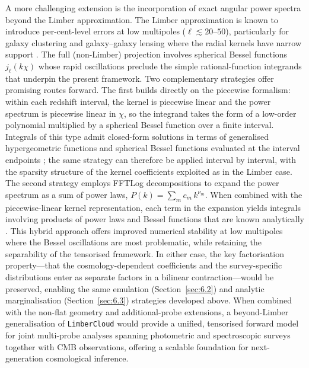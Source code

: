 A more challenging extension is the incorporation of exact angular power spectra beyond the Limber approximation. The Limber approximation is known to introduce per-cent-level errors at low multipoles (\(\ell \lesssim 20\)--\(50\)), particularly for galaxy clustering and galaxy--galaxy lensing where the radial kernels have narrow support \citep{2017A&A...602A..72C, 2025A&A...699A.124R}. The full (non-Limber) projection involves spherical Bessel functions \(j_\ell(k\chi)\) whose rapid oscillations preclude the simple rational-function integrands that underpin the present framework. Two complementary strategies offer promising routes forward. The first builds directly on the piecewise formalism: within each redshift interval, the kernel is piecewise linear and the power spectrum is piecewise linear in \(\chi\), so the integrand takes the form of a low-order polynomial multiplied by a spherical Bessel function over a finite interval. Integrals of this type admit closed-form solutions in terms of generalised hypergeometric functions and spherical Bessel functions evaluated at the interval endpoints \citep{2018PhRvD..97b3504G}; the same strategy can therefore be applied interval by interval, with the sparsity structure of the kernel coefficients exploited as in the Limber case. The second strategy employs FFTLog decompositions \citep{2000MNRAS.312..257H} to expand the power spectrum as a sum of power laws, \(P(k) = \sum_m c_m\, k^{\nu_m}\). When combined with the piecewise-linear kernel representation, each term in the expansion yields integrals involving products of power laws and Bessel functions that are known analytically \citep{2017JCAP...11..054A, 2020JCAP...05..010F, 2023PhRvD.108j3007F, 2025JOSS...10.8618R}. This hybrid approach offers improved numerical stability at low multipoles where the Bessel oscillations are most problematic, while retaining the separability of the tensorised framework. In either case, the key factorisation property---that the cosmology-dependent coefficients and the survey-specific distributions enter as separate factors in a bilinear contraction---would be preserved, enabling the same emulation (Section~\ref{sec:6.2}) and analytic marginalisation (Section~\ref{sec:6.3}) strategies developed above. When combined with the non-flat geometry and additional-probe extensions, a beyond-Limber generalisation of \texttt{LimberCloud} would provide a unified, tensorised forward model for joint multi-probe analyses spanning photometric and spectroscopic surveys together with CMB observations, offering a scalable foundation for next-generation cosmological inference.
